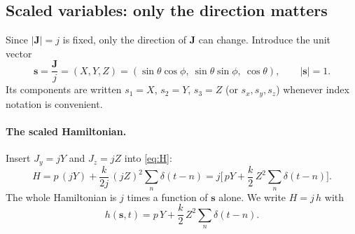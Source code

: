 \documentclass[11pt,a4paper]{article}
\newcommand{\vs}{\bm{s}}
\newcommand{\vJ}{\bm{J}}
\begin{document}
\subsection{Scaled variables: only the direction matters}\label{sec:scaled}

Since $|\vJ| = j$ is fixed, only the direction of $\vJ$ can change. Introduce the unit vector
\begin{equation}\label{eq:unit}
  \vs = \frac{\vJ}{j} = (X, Y, Z) = (\sin\theta\cos\phi,\ \sin\theta\sin\phi,\ \cos\theta), \qquad |\vs| = 1 .
\end{equation}
Its components are written $s_1 = X$, $s_2 = Y$, $s_3 = Z$ (or $s_x, s_y, s_z$) whenever index notation is
convenient.

\paragraph{The scaled Hamiltonian.} Insert $J_y = jY$ and $J_z = jZ$ into \eqref{eq:H}:
\begin{equation*}
  H = p\,(jY) + \frac{k}{2j}\,(jZ)^2 \sum_n\delta(t-n)
    = j\Big[\,pY + \frac{k}{2}\,Z^2 \sum_n\delta(t-n)\Big].
\end{equation*}
The whole Hamiltonian is $j$ times a function of $\vs$ alone. We write $H = j\,h$ with
\begin{equation}\label{eq:h}
  h(\vs,t) = p\, Y + \frac{k}{2}\, Z^2 \sum_n \delta(t-n).
\end{equation}
\end{document}
